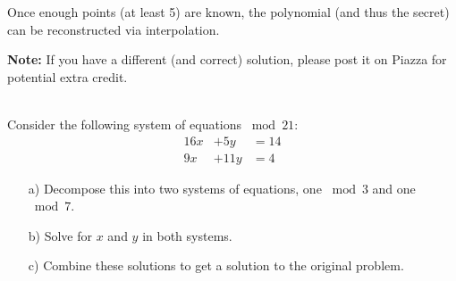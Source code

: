 \documentclass[]{article}
\begin{document}
\begin{qunlist}
{{Once enough points (at least 5) are known, the polynomial (and thus the secret) can be reconstructed via interpolation.

\textbf{Note:} If you have a different (and correct) solution, please post it on Piazza for potential extra credit.

}}\fi



\\ %
Consider the following system of equations $\bmod{21}$:
\begin{align*}
16x &+ 5y &= 14 \\
9x &+ 11y &= 4
\end{align*}

\begin{itemize}  
\qpart
\item[a)] Decompose this into two systems of equations, one $\bmod 3$ and one $\bmod 7$.
\qpart
\item[b)] Solve for $x$ and $y$ in both systems.
\qpart
\item[c)] Combine these solutions to get a solution to the original problem.
\end{itemize}



\end{qunlist}
\end{document}
